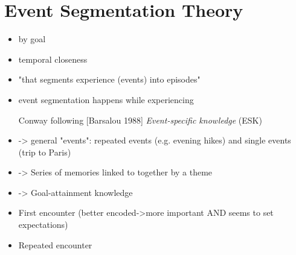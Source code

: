 \section{Event Segmentation Theory}
\cite{black_episodes_1979}\cite{ezzyat_what_2011}\cite{zacks_perceiving_2001}
\begin{itemize}
\item by goal \cite{black_episodes_1979}
\item temporal closeness \cite{black_episodes_1979}\cite{ezzyat_what_2011}
\item "that segments experience (events) into episodes" \cite[p. 248]{ezzyat_what_2011}
\item event segmentation happens while experiencing \cite[p. 248]{ezzyat_what_2011}

\item [Conway] following [Barsalou 1988] \textit{Event-specific knowledge} (ESK)
\item -> general "events": repeated events (e.g. evening hikes) and single events (trip to Paris)
\item -> Series of memories linked to together by a theme
\item -> Goal-attainment knowledge
\item First encounter (better encoded->more important AND seems to set expectations)
\item Repeated encounter
\end{itemize}






